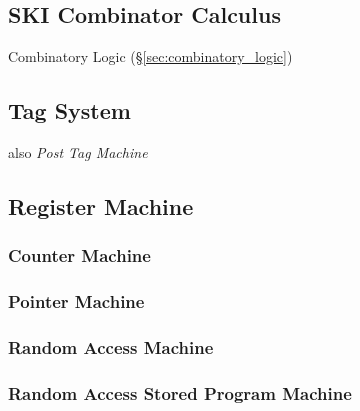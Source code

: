 \endgroup



\subsection{SKI Combinator Calculus}\label{sec:ski_calculus}

Combinatory Logic (\S\ref{sec:combinatory_logic})



\subsection{Tag System}\label{sec:tag_system}

also \emph{Post Tag Machine}



\subsection{Register Machine}\label{sec:register_machine}

\subsubsection{Counter Machine}

\subsubsection{Pointer Machine}

\subsubsection{Random Access Machine}

\subsubsection{Random Access Stored Program Machine}




